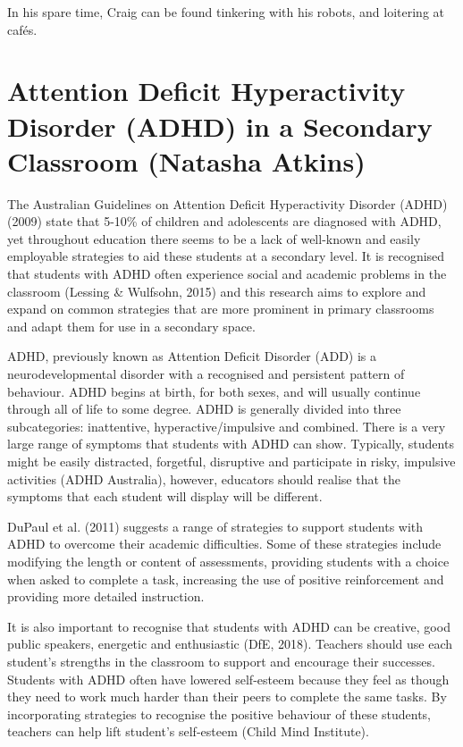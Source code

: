 \documentclass[twoside,14pt,a4paper,notitlepage]{memoir}
\begin{document}
In his spare time, Craig can be found tinkering with his robots, and loitering at cafés.



\section*{Attention Deficit Hyperactivity Disorder (ADHD) in a Secondary Classroom (Natasha Atkins)}
\label{aut:atkins}

The Australian Guidelines on Attention Deficit Hyperactivity Disorder (ADHD) (2009) state that 5-10\% of children and adolescents are diagnosed with ADHD, yet throughout education there seems to be a lack of well-known and easily employable strategies to aid these students at a secondary level. It is recognised that students with ADHD often experience social and academic problems in the classroom (Lessing \& Wulfsohn, 2015) and this research aims to explore and expand on common strategies that are more prominent in primary classrooms and adapt them for use in a secondary space.

ADHD, previously known as Attention Deficit Disorder (ADD) is a neurodevelopmental disorder with a recognised and persistent pattern of behaviour. ADHD begins at birth, for both sexes, and will usually continue through all of life to some degree. ADHD is generally divided into three subcategories: inattentive, hyperactive/impulsive and combined. There is a very large range of symptoms that students with ADHD can show. Typically, students might be easily distracted, forgetful, disruptive and participate in risky, impulsive activities (ADHD Australia), however, educators should realise that the symptoms that each student will display will be different.

DuPaul et al. (2011) suggests a range of strategies to support students with ADHD to overcome their academic difficulties. Some of these strategies include modifying the length or content of assessments, providing students with a choice when asked to complete a task, increasing the use of positive reinforcement and providing more detailed instruction.

It is also important to recognise that students with ADHD can be creative, good public speakers, energetic and enthusiastic (DfE, 2018). Teachers should use each student’s strengths in the classroom to support and encourage their successes. Students with ADHD often have lowered self-esteem because they feel as though they need to work much harder than their peers to complete the same tasks. By incorporating strategies to recognise the positive behaviour of these students, teachers can help lift student’s self-esteem (Child Mind Institute).
\end{document}
